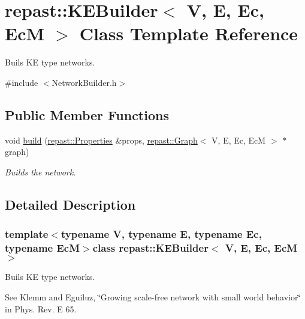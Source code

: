 \hypertarget{classrepast_1_1_k_e_builder}{\section{repast\-:\-:K\-E\-Builder$<$ V, E, Ec, Ec\-M $>$ Class Template Reference}
\label{classrepast_1_1_k_e_builder}
}


Buils K\-E type networks.  




{\ttfamily \#include $<$Network\-Builder.\-h$>$}

\subsection*{Public Member Functions}
\begin{DoxyCompactItemize}
\item 
void \hyperlink{classrepast_1_1_k_e_builder_a89b6f648c29bb59fd0b3f2495b9c2fc0}{build} (\hyperlink{classrepast_1_1_properties}{repast\-::\-Properties} \&props, \hyperlink{classrepast_1_1_graph}{repast\-::\-Graph}$<$ V, E, Ec, Ec\-M $>$ $\ast$graph)
\begin{DoxyCompactList}\small\item\em Builds the network. \end{DoxyCompactList}\end{DoxyCompactItemize}


\subsection{Detailed Description}
\subsubsection*{template$<$typename V, typename E, typename Ec, typename Ec\-M$>$class repast\-::\-K\-E\-Builder$<$ V, E, Ec, Ec\-M $>$}

Buils K\-E type networks. 

See Klemm and Eguiluz, \char`\"{}\-Growing scale-\/free network with small world behavior\char`\"{} in Phys. Rev. E 65. 

